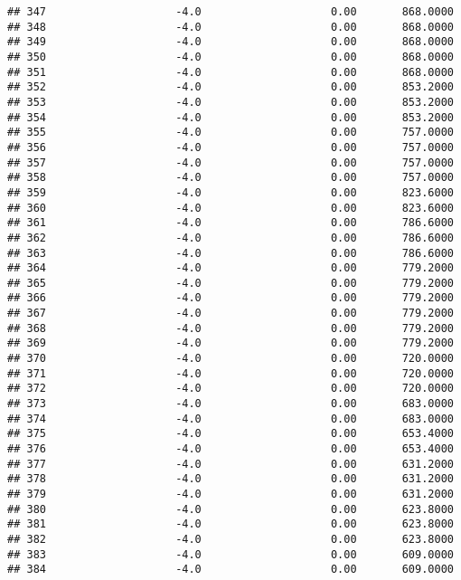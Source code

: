 \documentclass[]{article}
\begin{document}
\begin{verbatim}
## 347                    -4.0                    0.00       868.0000
## 348                    -4.0                    0.00       868.0000
## 349                    -4.0                    0.00       868.0000
## 350                    -4.0                    0.00       868.0000
## 351                    -4.0                    0.00       868.0000
## 352                    -4.0                    0.00       853.2000
## 353                    -4.0                    0.00       853.2000
## 354                    -4.0                    0.00       853.2000
## 355                    -4.0                    0.00       757.0000
## 356                    -4.0                    0.00       757.0000
## 357                    -4.0                    0.00       757.0000
## 358                    -4.0                    0.00       757.0000
## 359                    -4.0                    0.00       823.6000
## 360                    -4.0                    0.00       823.6000
## 361                    -4.0                    0.00       786.6000
## 362                    -4.0                    0.00       786.6000
## 363                    -4.0                    0.00       786.6000
## 364                    -4.0                    0.00       779.2000
## 365                    -4.0                    0.00       779.2000
## 366                    -4.0                    0.00       779.2000
## 367                    -4.0                    0.00       779.2000
## 368                    -4.0                    0.00       779.2000
## 369                    -4.0                    0.00       779.2000
## 370                    -4.0                    0.00       720.0000
## 371                    -4.0                    0.00       720.0000
## 372                    -4.0                    0.00       720.0000
## 373                    -4.0                    0.00       683.0000
## 374                    -4.0                    0.00       683.0000
## 375                    -4.0                    0.00       653.4000
## 376                    -4.0                    0.00       653.4000
## 377                    -4.0                    0.00       631.2000
## 378                    -4.0                    0.00       631.2000
## 379                    -4.0                    0.00       631.2000
## 380                    -4.0                    0.00       623.8000
## 381                    -4.0                    0.00       623.8000
## 382                    -4.0                    0.00       623.8000
## 383                    -4.0                    0.00       609.0000
## 384                    -4.0                    0.00       609.0000

\end{verbatim}
\end{document}
